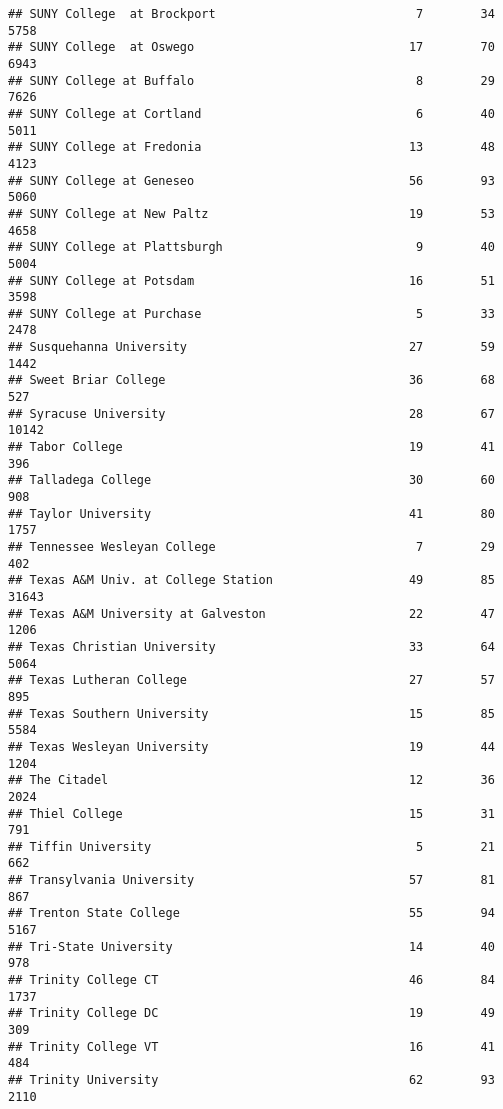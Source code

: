 \documentclass[
]{article}
\begin{document}
\begin{verbatim}
## SUNY College  at Brockport                            7        34        5758
## SUNY College  at Oswego                              17        70        6943
## SUNY College at Buffalo                               8        29        7626
## SUNY College at Cortland                              6        40        5011
## SUNY College at Fredonia                             13        48        4123
## SUNY College at Geneseo                              56        93        5060
## SUNY College at New Paltz                            19        53        4658
## SUNY College at Plattsburgh                           9        40        5004
## SUNY College at Potsdam                              16        51        3598
## SUNY College at Purchase                              5        33        2478
## Susquehanna University                               27        59        1442
## Sweet Briar College                                  36        68         527
## Syracuse University                                  28        67       10142
## Tabor College                                        19        41         396
## Talladega College                                    30        60         908
## Taylor University                                    41        80        1757
## Tennessee Wesleyan College                            7        29         402
## Texas A&M Univ. at College Station                   49        85       31643
## Texas A&M University at Galveston                    22        47        1206
## Texas Christian University                           33        64        5064
## Texas Lutheran College                               27        57         895
## Texas Southern University                            15        85        5584
## Texas Wesleyan University                            19        44        1204
## The Citadel                                          12        36        2024
## Thiel College                                        15        31         791
## Tiffin University                                     5        21         662
## Transylvania University                              57        81         867
## Trenton State College                                55        94        5167
## Tri-State University                                 14        40         978
## Trinity College CT                                   46        84        1737
## Trinity College DC                                   19        49         309
## Trinity College VT                                   16        41         484
## Trinity University                                   62        93        2110

\end{verbatim}
\end{document}
